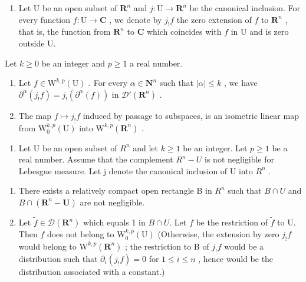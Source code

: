 \begin{enumerate}
\def\labelenumi{\arabic{enumi})}
\setcounter{enumi}{12}
\tightlist
\item
  Let U be an open subset of \(\mathbf{R}^n\) and \(j\colon \mathrm{U}\to \mathbf{R}^n\) be the canonical inclusion. For every function \(f\colon \mathrm{U}\to \mathbf{C}\) , we denote by \(j_{!}f\) the zero extension of \(f\) to \(\mathbf{R}^n\) , that is, the function from \(\mathbf{R}^n\) to \(\mathbf{C}\) which coincides with \(f\) in U and is zero outside U.
\end{enumerate}

Let \(k \geqslant 0\) be an integer and \(p \geqslant 1\) a real number.

\begin{enumerate}
\def\labelenumi{\alph{enumi})}
\item
  Let \(f \in \mathrm{W}^{k,p}(\mathrm{U})\) . For every \(\alpha \in \mathbf{N}^n\) such that \(|\alpha| \leqslant k\) , we have \(\partial^\alpha(j_{!}f) = j_{!}(\partial^\alpha(f))\) in \(\mathcal{D}'(\mathbf{R}^n)\) .
\item
  The map \(f \mapsto j_{!}f\) induced by passage to subspaces, is an isometric linear map from \(\mathrm{W}_{0}^{k,p}(\mathrm{U})\) into \(\mathrm{W}^{k,p}(\mathbf{R}^{n})\) .
\end{enumerate}

\begin{enumerate}
\def\labelenumi{\arabic{enumi})}
\setcounter{enumi}{13}
\tightlist
\item
  Let U be an open subset of \(R^{n}\) and let \(k \geqslant 1\) be an integer. Let \(p \geqslant 1\) be a real number. Assume that the complement \(R^{n} - U\) is not negligible for Lebesgue measure. Let j denote the canonical inclusion of U into \(R^{n}\) .
\end{enumerate}

\begin{enumerate}
\def\labelenumi{\alph{enumi})}
\item
  There exists a relatively compact open rectangle B in \(R^{n}\) such that \(B \cap U\) and \(B \cap (\mathbf{R}^{n} - \mathbf{U})\) are not negligible.
\item
  Let \(\widetilde{f} \in \mathcal{D}(\mathbf{R}^n)\) which equals 1 in \(B \cap U\). Let \(f\) be the restriction of \(\widetilde{f}\) to U. Then \(f\) does not belong to \(\mathrm{W}_0^{k,p}(\mathrm{U})\) (Otherwise, the extension by zero \(j_{!}f\) would belong to \(\mathrm{W}^{k,p}(\mathbf{R}^n)\) ; the restriction to B of \(j_{!}f\) would be a distribution such that \(\partial_i(j_{!}f) = 0\) for \(1 \leqslant i \leqslant n\) , hence would be the distribution associated with a constant.)
\end{enumerate}

